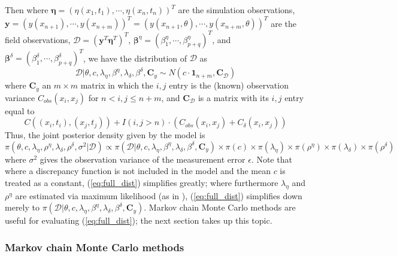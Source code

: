 \documentclass{article}
\begin{document}
Then where $\boldsymbol \eta = (\eta(x_1,t_1),\cdots,\eta(x_n,t_n))^T$ are the simulation observations, $\mathbf y = (y(x_{n+1}),\cdots,y(x_{n+m}))^T= (y(x_{n+1},\theta),\cdots,y(x_{n+m},\theta))^T$ are the field observations, $\mathcal D = (\mathbf y^T \boldsymbol \eta^T)^T$, $\boldsymbol \beta^\eta = (\beta^\eta_1,\cdots,\beta_{p+q}^\eta)^T$, and $\boldsymbol \beta^\delta = (\beta^\delta_1,\cdots,\beta_{p+q}^\delta)^T$, we have the distribution of $\mathcal D$ as
\begin{equation}
\mathcal D | \theta,c,\lambda_\eta, \beta^\eta,\lambda_\delta,\beta^\delta,\mathbf C_y \sim N(c \cdot \mathbf 1_{n+m}, \mathbf C_{\mathcal D})
\end{equation}
where $\mathbf C_y$ an $m\times m$ matrix in which the $i,j$ entry is the (known) observation variance $C_{obs}(x_i,x_j)$ for $n<i,j\leq n+m$, and $\mathbf C_{\mathcal D}$ is a matrix with its $i,j$ entry equal to
\begin{equation}
C((x_i,t_i),(x_j,t_j)) + I(i,j>n)\cdot(C_{obs}(x_i,x_j) + C_\delta(x_i,x_j))
\end{equation}
Thus, the joint posterior density given by the model is
\begin{equation} \label{eq:full_dist}
\pi(\theta,c,\lambda_\eta,\rho^\eta,\lambda_\delta,\rho^\delta,\sigma^2|\mathcal D)
\propto \pi(\mathcal D | \theta,c,\lambda_\eta, \beta^\eta,\lambda_\delta,\beta^\delta,\mathbf C_y) \times \pi(c) \times \pi(\lambda_\eta) \times 
\pi(\rho^\eta) \times \pi(\lambda_\delta) \times \pi(\rho^\delta)
\end{equation}
where $\sigma^2$ gives the observation variance of the measurement error $\epsilon$. Note that where a discrepancy function is not included in the model and the mean $c$ is treated as a constant, (\ref{eq:full_dist}) simplifies greatly; where furthermore $\lambda_\eta$ and $\rho^\eta$ are estimated via maximum likelihood (as in  \cite{Kennedy2001}),  (\ref{eq:full_dist}) simplifies down merely to 
$\pi(\mathcal D | \theta,c,\lambda_\eta, \beta^\eta,\lambda_\delta,\beta^\delta,\mathbf C_y)$. Markov chain Monte Carlo methods are useful for evaluating (\ref{eq:full_dist}); the next section takes up this topic.

\subsubsection{Markov chain Monte Carlo methods}

\end{document}
